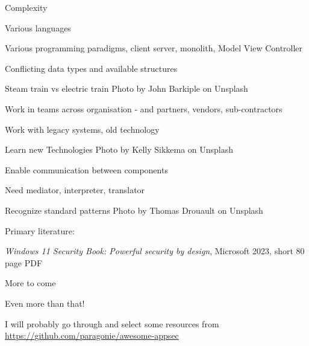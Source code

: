 \documentclass[Screen16to9,17pt]{foils}
\begin{document}
\begin{list2}
\item Complexity
\item Various languages
\item Various programming paradigms, client server, monolith, Model View Controller
\item Conflicting data types and available structures
\item Steam train vs electric train \hfill Photo by John Barkiple on Unsplash

\end{list2}






\begin{list2}
\item Work in teams across organisation - and partners, vendors, sub-contractors
\item Work with legacy systems, old technology
\item Learn new Technologies \hfill Photo by Kelly Sikkema on Unsplash
\end{list2}







\begin{list2}
\item Enable communication between components
\item Need mediator, interpreter, translator
\item Recognize standard patterns \hfill Photo by Thomas Drouault on Unsplash
\end{list2}


Primary literature:
\begin{list2}
\item \emph{Windows 11 Security Book: Powerful security by design}, Microsoft 2023, short 80 page PDF\\ {\scriptsize{}}

\item More to come
\item Even more than that!
\item I will probably go through and select some resources from \url{https://github.com/paragonie/awesome-appsec}
\end{list2}
\end{document}
